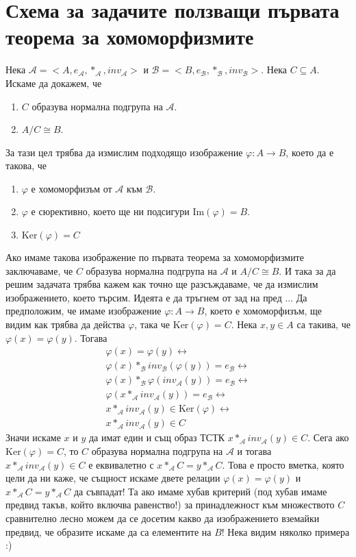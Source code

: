 \documentclass[12pt]{article}
\begin{document}
\section{Схема за задачите ползващи първата теорема за хомоморфизмите}
Нека \(\mathcal{A} = <A, e_\mathcal{A}, *_\mathcal{A}, inv_\mathcal{A}>\)
и \(\mathcal{B} = <B, e_\mathcal{B}, *_\mathcal{B}, inv_\mathcal{B}>\).
Нека \(C \subseteq A\).
Искаме да докажем, че
\begin{enumerate}
    \item \(C\) образува нормална подгрупа на \(\mathcal{A}\).
    \item \(A / C \cong B\).
\end{enumerate}
За тази цел трябва да измислим подходящо изображение
\(\varphi : A \to B\), което да е такова, че
\begin{enumerate}
    \item \(\varphi\) е хомоморфизъм от \(\mathcal{A}\) към \(\mathcal{B}\).
    \item \(\varphi\) е сюрективно, което ще ни подсигури \(\mathrm{Im}(\varphi) = B\).
    \item \(\mathrm{Ker}(\varphi) = C\)
\end{enumerate}
Ако имаме такова изображение по първата теорема за хомоморфизмите заключаваме, че
\(C\) образува нормална подгрупа на \(\mathcal{A}\) и \(A / C \cong B\).
И така за да решим задачата трябва кажем как точно ще разсъждаваме, че да измислим изображението, което търсим. Идеята е да тръгнем от зад на пред ...
Да предположим, че имаме изображение \(\varphi : A \to B\), което е хомоморфизъм,
ще видим как трябва да действа \(\varphi\), така че \(\mathrm{Ker}(\varphi) = C\).
Нека \(x, y \in A\) са такива, че \(\varphi(x) = \varphi(y)\). Тогава
\begin{align*}
    \varphi(x) = \varphi(y) \longleftrightarrow \\
    \varphi(x) *_{\mathcal{B}} inv_{\mathcal{B}}(\varphi(y)) = e_{\mathcal{B}} \longleftrightarrow \\
    \varphi(x) *_{\mathcal{B}} \varphi(inv_{\mathcal{A}}(y)) = e_{\mathcal{B}} \longleftrightarrow \\
    \varphi(x *_{\mathcal{A}} inv_{\mathcal{A}}(y)) = e_{\mathcal{B}} \longleftrightarrow \\
    x *_{\mathcal{A}} inv_{\mathcal{A}}(y) \in \mathrm{Ker}(\varphi) \longleftrightarrow \\
    x *_{\mathcal{A}} inv_{\mathcal{A}}(y) \in C
\end{align*}
Значи искаме \(x\) и \(y\) да имат един и същ образ ТСТК \(x *_{\mathcal{A}} inv_{\mathcal{A}}(y) \in C\). Сега ако \(\mathrm{Ker}(\varphi) = C\), то \(C\) образува нормална подгрупа на \(\mathcal{A}\) и тогава \(x *_{\mathcal{A}} inv_{\mathcal{A}}(y) \in C\) е еквивалетно с \(x *_{\mathcal{A}} C = y *_{\mathcal{A}} C\). Това е просто вметка,
която цели да ни каже, че същност искаме двете релации \(\varphi(x) = \varphi(y)\) и \(x *_{\mathcal{A}} C = y *_{\mathcal{A}} C\) да съвпадат!
Та ако имаме хубав критерий (под хубав имаме предвид такъв, който включва равенство!) за принадлежност към множеството \(C\) сравнително лесно можем да се досетим какво да изображението вземайки предвид, че образите искаме да са елементите на \(B\)! Нека видим няколко примера :)
\end{document}
